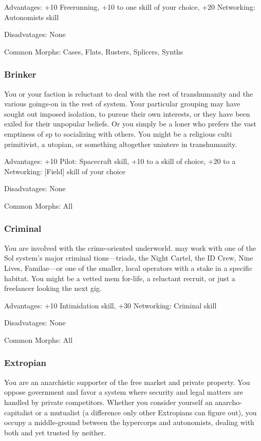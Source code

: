 Advantages: +10 Freerunning, +10 to one skill of your choice, +20 Networking:
Autonomists skill

Disadvatages: None

Common Morphs: Cases, Flats, Rusters, Splicers, Synths

\subsubsection{Brinker}
You or your faction is reluctant to deal with the rest of transhumanity and the
various goings-on in the rest of system. Your particular grouping may have
sought out imposed isolation, to pursue their own interests, or they have been
exiled for their unpopular beliefs. Or you simply be a loner who prefers the
vast emptiness of sp to socializing with others. You might be a religious culti
primitivist, a utopian, or something altogether unintere in transhumanity.

Advantages: +10 Pilot: Spacecraft skill, +10 to a skill of choice, +20 to a
Networking: [Field] skill of your choice

Disadvatages: None

Common Morphs: All

\subsubsection{Criminal}
You are involved with the crime-oriented underworld.  may work with one of the
Sol system’s major criminal tions—triads, the Night Cartel, the ID Crew, Nine
Lives, Familae—or one of the smaller, local operators with a stake in a
specific habitat. You might be a vetted mem for-life, a reluctant recruit, or
just a freelancer looking the next gig.

Advantages: +10 Intimidation skill, +30 Networking: Criminal skill

Disadvatages: None

Common Morphs: All

\subsubsection{Extropian}
You are an anarchistic supporter of the free market and private property. You
oppose government and favor a system where security and legal matters are
handled by private competitors. Whether you consider yourself an
anarcho-capitalist or a mutualist (a difference only other Extropians can
figure out), you occupy a middle-ground between the hypercorps and autonomists,
dealing with both and yet trusted by neither.

